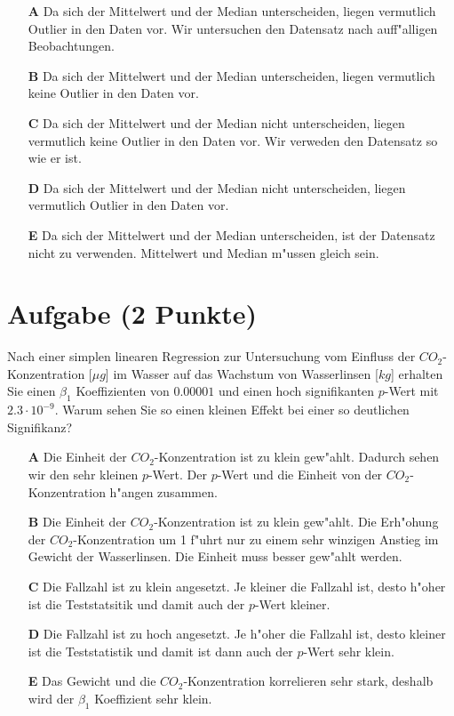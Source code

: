 \documentclass[a4paper, 10pt]{scrartcl}\usepackage[]{graphicx}\usepackage[]{xcolor}
\begin{document}
\begin{enumerate}
\item [\textbf{A} \msquare] Da sich der Mittelwert und der Median unterscheiden, liegen vermutlich Outlier in den Daten vor. Wir untersuchen den Datensatz nach auff{"a}lligen Beobachtungen.
\item [\textbf{B} \msquare] Da sich der Mittelwert und der Median unterscheiden, liegen vermutlich keine Outlier in den Daten vor.
\item [\textbf{C} \msquare] Da sich der Mittelwert und der Median nicht unterscheiden, liegen vermutlich keine Outlier in den Daten vor. Wir verweden den Datensatz so wie er ist.
\item [\textbf{D} \msquare] Da sich der Mittelwert und der Median nicht unterscheiden, liegen vermutlich Outlier in den Daten vor.
\item [\textbf{E} \msquare] Da sich der Mittelwert und der Median unterscheiden, ist der Datensatz nicht zu verwenden. Mittelwert und Median m{"u}ssen gleich sein.
\end{enumerate} 

\section{Aufgabe \hfill (2 Punkte)}

Nach einer simplen linearen Regression zur Untersuchung vom Einfluss der
$CO_2$-Konzentration [$\mu g$] im Wasser auf das Wachstum von Wasserlinsen
[$kg$] erhalten Sie einen $\beta_1$ Koeffizienten von $0.00001$ und einen
hoch signifikanten $p$-Wert mit $2.3\cdot 10^{-9}$. Warum sehen Sie so einen kleinen
Effekt bei einer so deutlichen Signifikanz? 




\begin{enumerate}
\item [\textbf{A} \msquare] Die Einheit der $CO_2$-Konzentration ist zu klein gew{"a}hlt. Dadurch sehen wir den sehr kleinen $p$-Wert. Der $p$-Wert und die Einheit von der $CO_2$-Konzentration h{"a}ngen zusammen.
\item [\textbf{B} \msquare] Die Einheit der $CO_2$-Konzentration ist zu klein gew{"a}hlt. Die Erh{"o}hung der $CO_2$-Konzentration um 1 f{"u}hrt nur zu einem sehr winzigen Anstieg im Gewicht der Wasserlinsen. Die Einheit muss besser gew{"a}hlt werden.
\item [\textbf{C} \msquare] Die Fallzahl ist zu klein angesetzt. Je kleiner die Fallzahl ist, desto h{"o}her ist die Teststatsitik und damit auch der $p$-Wert kleiner. 
\item [\textbf{D} \msquare] Die Fallzahl ist zu hoch angesetzt. Je h{"o}her die Fallzahl ist, desto kleiner ist die Teststatistik und damit ist dann auch der $p$-Wert sehr klein.
\item [\textbf{E} \msquare] Das Gewicht und die $CO_2$-Konzentration korrelieren sehr stark, deshalb wird der $\beta_1$ Koeffizient sehr klein.
\end{enumerate} 
\end{document}
